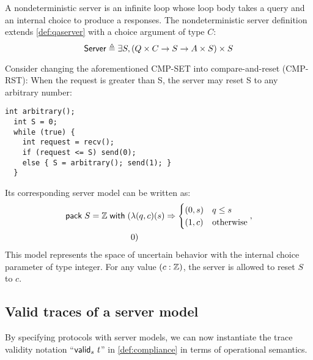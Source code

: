 \begin{definition}
  \label{def:server}
  A nondeterministic server is an infinite loop whose loop body takes a query
  and an internal choice to produce a responses.  The nondeterministic server
  definition extends \autoref{def:qaserver} with a choice argument of type $C$:
  \[\mathsf{Server}\triangleq\exists S,(Q\times C\to S\to A\times S)\times S\]
\end{definition}

Consider changing the aforementioned CMP-SET into compare-and-reset (CMP-RST):
When the request is greater than \inlinec S, the server may reset \inlinec S to
any arbitrary number:
\begin{lstlisting}[style=customc]
  int arbitrary();
  int S = 0;
  while (true) {
    int request = recv();
    if (request <= S) send(0);
    else { S = arbitrary(); send(1); }
  }
\end{lstlisting}
Its corresponding server model can be written as:
\begin{align*}
  \mathsf{pack}\;S=\mathbb Z\;\mathsf{with}\;(&\lambda(q,c)(s)\Rightarrow
      \begin{cases}
        (0,s)& q\le s\\
        (1,c)&\mathrm{otherwise}
      \end{cases}
   ,\\
    &0)
\end{align*}
This model represents the space of uncertain behavior with the internal choice
parameter of type integer.  For any value $(c:\mathbb Z)$, the server is allowed to
reset $S$ to $c$.

\subsection{Valid traces of a server model}
By specifying protocols with server models, we can now instantiate the trace
validity notation ``$\mathsf{valid}_{s}~{t}$'' in \autoref{def:compliance} in terms of
operational semantics.


